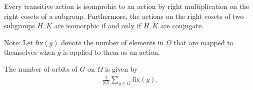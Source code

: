 \documentclass{memoir}
\begin{document}
\begin{cor}
	Every transitive action is isomprohic to an action by right multiplication on the right cosets of a subgroup. Furthermore, the actions on the right cosets of two subgroups \(H,K\) are isomorphic if and only if \(H,K\) are conjugate.
\end{cor}

Note: Let \( \textrm{fix}(g)\) denote the number of elements in \(\Omega\) that are mapped to themselves when \(g\) is applied to them as an action.

\begin{thm}
	The number of orbits of \(G\) on \(\Omega\) is given by
	\begin{align*}
	\frac{1}{\left| G \right| } \sum_{g\in G} \textrm{fix}(g).	
\end{align*}
\end{thm}
\end{document}
